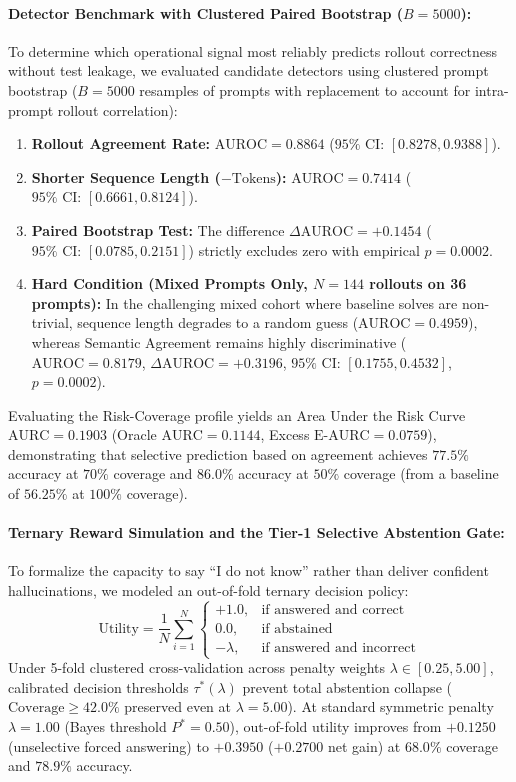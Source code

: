 \documentclass[11pt,a4paper]{article}
\begin{document}
\paragraph{Detector Benchmark with Clustered Paired Bootstrap ($B=5000$):}
To determine which operational signal most reliably predicts rollout correctness without test leakage, we evaluated candidate detectors using clustered prompt bootstrap ($B=5000$ resamples of prompts with replacement to account for intra-prompt rollout correlation):
\begin{enumerate}
    \item \textbf{Rollout Agreement Rate:} $\text{AUROC} = \mathbf{0.8864}$ ($95\%\text{ CI: } [0.8278, 0.9388]$).
    \item \textbf{Shorter Sequence Length ($-\text{Tokens}$):} $\text{AUROC} = 0.7414$ ($95\%\text{ CI: } [0.6661, 0.8124]$).
    \item \textbf{Paired Bootstrap Test:} The difference $\Delta\text{AUROC} = +0.1454$ ($95\%\text{ CI: } [0.0785, 0.2151]$) strictly excludes zero with empirical $p = 0.0002$.
    \item \textbf{Hard Condition (Mixed Prompts Only, $N=144$ rollouts on 36 prompts):} In the challenging mixed cohort where baseline solves are non-trivial, sequence length degrades to a random guess ($\text{AUROC} = 0.4959$), whereas Semantic Agreement remains highly discriminative ($\text{AUROC} = \mathbf{0.8179}$, $\Delta\text{AUROC} = +0.3196$, $95\%\text{ CI: } [0.1755, 0.4532]$, $p = 0.0002$).
\end{enumerate}
Evaluating the Risk-Coverage profile yields an Area Under the Risk Curve $\text{AURC} = 0.1903$ (Oracle $\text{AURC} = 0.1144$, Excess $\text{E-AURC} = 0.0759$), demonstrating that selective prediction based on agreement achieves $77.5\%$ accuracy at $70\%$ coverage and $86.0\%$ accuracy at $50\%$ coverage (from a baseline of $56.25\%$ at $100\%$ coverage).

\paragraph{Ternary Reward Simulation and the Tier-1 Selective Abstention Gate:}
To formalize the capacity to say ``I do not know'' rather than deliver confident hallucinations, we modeled an out-of-fold ternary decision policy:
\begin{equation}
\text{Utility} = \frac{1}{N} \sum_{i=1}^N \begin{cases} +1.0, & \text{if answered and correct} \\ 0.0, & \text{if abstained} \\ -\lambda, & \text{if answered and incorrect} \end{cases}
\end{equation}
Under 5-fold clustered cross-validation across penalty weights $\lambda \in [0.25, 5.00]$, calibrated decision thresholds $\tau^*(\lambda)$ prevent total abstention collapse ($\text{Coverage} \ge 42.0\%$ preserved even at $\lambda = 5.00$). At standard symmetric penalty $\lambda = 1.00$ (Bayes threshold $P^* = 0.50$), out-of-fold utility improves from $+0.1250$ (unselective forced answering) to \textbf{$+0.3950$} ($+0.2700$ net gain) at $68.0\%$ coverage and $78.9\%$ accuracy.
\end{document}
